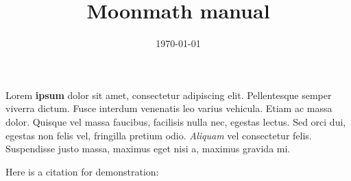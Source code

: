 \documentclass[a4paper, 12pt]{book}
\title{Moonmath manual}
\author{}
\date{\today}
\theoremstyle{plain}
\begin{document}
\maketitle

Lorem \textbf{ipsum} dolor sit amet, consectetur adipiscing elit. Pellentesque semper viverra dictum.  Fusce interdum venenatis leo varius vehicula. Etiam ac massa dolor. Quisque vel massa faucibus, facilisis nulla nec, egestas lectus. Sed orci dui, egestas non felis vel, fringilla pretium odio. \textit{Aliquam} vel consectetur felis. Suspendisse justo massa, maximus eget nisi a, maximus gravida mi.

Here is a citation for demonstration: \cite{lamport1982the}


%




\end{document}
